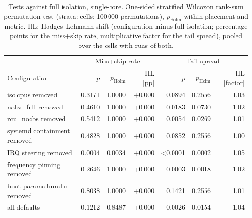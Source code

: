 \begin{table}[ht]
\centering
\small
\begin{tabular}{l|rrr|rrr}
\toprule
 & \multicolumn{3}{c|}{Miss+skip rate} & \multicolumn{3}{c}{Tail spread} \\
Configuration & $p$ & $p_{\mathrm{Holm}}$ & HL [pp] & $p$ & $p_{\mathrm{Holm}}$ & HL [factor] \\
\midrule
isolcpus removed & 0.3171 & 1.0000 & +0.000 & 0.0894 & 0.2556 & 1.03 \\
nohz\_full removed & 0.4610 & 1.0000 & +0.000 & 0.0183 & 0.0730 & 1.02 \\
rcu\_nocbs removed & 0.5412 & 1.0000 & +0.000 & 0.0054 & 0.0269 & 1.01 \\
systemd containment removed & 0.4828 & 1.0000 & +0.000 & 0.0852 & 0.2556 & 1.00 \\
IRQ steering removed & 0.0004 & 0.0034 & +0.000 & <0.0001 & 0.0002 & 1.05 \\
frequency pinning removed & 0.2646 & 1.0000 & +0.000 & 0.0003 & 0.0018 & 1.02 \\
boot-params bundle removed & 0.8038 & 1.0000 & +0.000 & 0.1421 & 0.2556 & 1.01 \\
all defaults & 0.1212 & 0.8487 & +0.000 & 0.0026 & 0.0154 & 1.04 \\
\bottomrule
\end{tabular}
\caption{Tests against full isolation, single-core. One-sided stratified Wilcoxon rank-sum permutation test (strata: cells; 100\,000 permutations), $p_{\mathrm{Holm}}$ within placement and metric. HL: Hodges--Lehmann shift (configuration minus full isolation; percentage points for the miss+skip rate, multiplicative factor for the tail spread), pooled over the cells with runs of both.}
\label{tab:rq1-rerun-tests-single-core}
\end{table}
